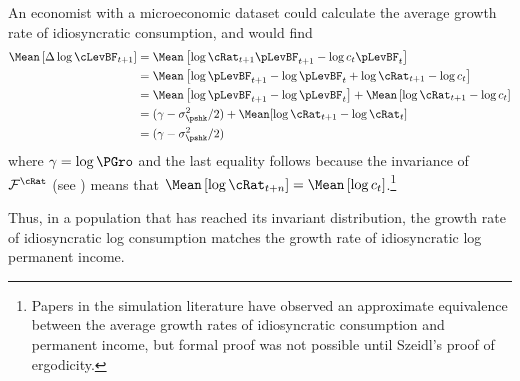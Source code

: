 \documentclass[BufferStockTheory]{subfiles}
\begin{document}
An economist with a microeconomic dataset could calculate the average
growth rate of idiosyncratic consumption, and would find
\begin{align*}
  \Mean\left[\Delta \log \cLevBF_{t+1}\right]  & = \Mean\left[ \log {\cRat}_{t+1}\pLevBF_{t+1} - \log c_{t}\pLevBF_{t}\right]  \notag \\
                                               & = \Mean\left[ \log \pLevBF_{t+1}- \log \pLevBF_{t} + \log {\cRat}_{t+1} - \log c_{t}\right]  \notag \\
                                               & = \Mean\left[ \log \pLevBF_{t+1}- \log \pLevBF_{t}\right] + \Mean\left[ \log {\cRat}_{t+1} - \log c_{t}\right]  \notag \\
                                               & = (\gamma - \sigma^{2}_{\pshk}/2) + \Mean[\log \cRat_{t+1} - \log \cRat_{t}] \\
                                               & = (\gamma - \sigma^{2}_{\pshk}/2)
\end{align*}
where $\gamma=\log \PGro$ and the last equality follows because the invariance of
$\mathcal{F}^{\cRat}$ (see \cite{szeidlInvariant}) means that $\Mean\left[ \log
  {\cRat}_{t+n}\right] = \Mean\left[ \log
  c_{t}\right]$.\footnote{Papers in the simulation literature have
  observed an approximate equivalence between the average growth rates
  of idiosyncratic consumption and permanent income, but formal proof
  was not possible until Szeidl's proof of ergodicity.}

Thus, in a population that has reached its invariant distribution, the growth
rate of idiosyncratic log consumption matches the growth rate of idiosyncratic log permanent income.
\end{document}
